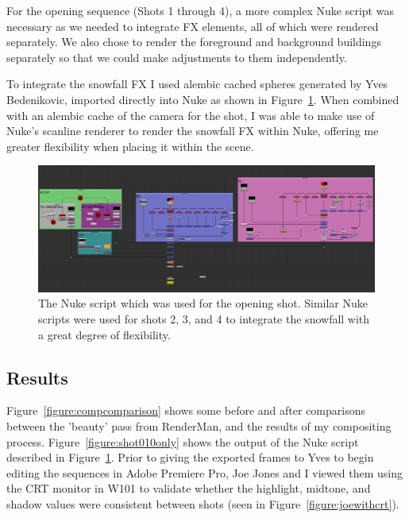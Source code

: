 \documentclass[11pt]{article}
\begin{document}
For the opening sequence (Shots 1 through 4), a more complex Nuke script was necessary as we needed to integrate FX elements, all of which were rendered separately. We also chose to render the foreground and background buildings separately so that we could make adjustments to them independently.

To integrate the snowfall FX I used alembic cached spheres generated by Yves Bedenikovic, imported directly into Nuke as shown in Figure~\ref{figure:shot010comp}. When combined with an alembic cache of the camera for the shot, I was able to make use of Nuke's scanline renderer to render the snowfall FX within Nuke, offering me greater flexibility when placing it within the scene.

\begin{figure}[htbp]\centering
	\includegraphics[width=1.0\linewidth]{images/shot010comp.png}
	\caption{\label{figure:shot010comp} The Nuke script which was used for the opening shot. Similar Nuke scripts were used for shots 2, 3, and 4 to integrate the snowfall with a great degree of flexibility.}
\end{figure}

\subsection{Results}

Figure~\ref{figure:compcomparison} shows some before and after comparisons between the 'beauty' pass from RenderMan, and the results of my compositing process. Figure~\ref{figure:shot010only} shows the output of the Nuke script described in Figure~\ref{figure:shot010comp}. Prior to giving the exported frames to Yves to begin editing the sequences in Adobe Premiere Pro, Joe Jones and I viewed them using the CRT monitor in W101 to validate whether the highlight, midtone, and shadow values were consistent between shots (seen in Figure~\ref{figure:joewithcrt}).
\end{document}
